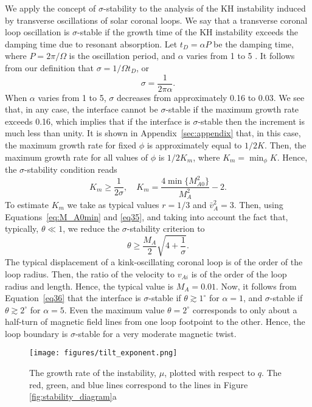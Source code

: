 \documentclass[12pt]{ociamthesis}
\begin{document}
We apply the concept of $\sigma$-stability to the analysis of the KH instability induced by transverse oscillations of solar coronal loops.
We say that a transverse coronal loop oscillation is $\sigma$-stable if the growth time of the KH instability exceeds the damping time due to resonant absorption.
Let $t_D = \alpha P$ be the damping time, where $P = 2 \pi / \Omega$ is the oscillation period, and $\alpha$ varies from 1 to 5 \citep[see, e.g.,][]{Goddard2016}.
It follows from our definition that $\sigma = 1/ \Omega t_D$, or
%
\begin{equation}
\label{eq34}
\sigma = \frac{1}{2\pi\alpha}.
\end{equation}
%
When $\alpha$ varies from 1 to 5, $\sigma$ decreases from approximately 0.16 to 0.03.
We see that, in any case, the interface cannot be $\sigma$\/-stable if the maximum growth rate exceeds 0.16, which implies that if the interface is $\sigma$\/-stable then the increment is much less than unity.
It is shown in Appendix~\ref{sec:appendix} that, in this case, the maximum growth rate for fixed $\phi$ is approximately equal to $1/2K$.
Then, the maximum growth rate for all values of $\phi$ is $1/2K_m$\/, where $K_m = \min_\phi K$.
Hence, the $\sigma$\/-stability condition reads
%
\begin{equation}
\label{eq35}
K_m \geq \frac1{2\sigma}, \quad K_m = \frac{4\min\{M_{A 0}^2\}}{M_A^2} - 2.
\end{equation}
%
To estimate $K_m$ we take as typical values $r = 1/3$ and $\bar v_A^2 = 3$.
Then, using Equations~\eqref{eq:M_A0min} and \eqref{eq35}, and taking into account the fact that, typically, $\theta \ll 1$, we reduce the $\sigma$-stability criterion to
%
\begin{equation}
\label{eq36}
\theta \geq \frac{M_A}{2} \sqrt{4 + \frac1\sigma}.
\end{equation}
%
The typical displacement of a kink-oscillating coronal loop is of the order of the loop radius.
Then, the ratio of the velocity to $v_{Ai}$ is of the order of the loop radius and length.
Hence, the typical value is $M_A = 0.01$.
Now, it follows from Equation~\eqref{eq36} that the interface is $\sigma$\/-stable if $\theta \gtrsim 1^\circ$ for $\alpha = 1$, and $\sigma$\/-stable if $\theta \gtrsim 2^\circ$ for $\alpha = 5$.
Even the maximum value $\theta = 2^\circ$ corresponds to only about a half-turn of magnetic field lines from one loop footpoint to the other.
Hence, the loop boundary is $\sigma$\/-stable for a very moderate magnetic twist.

\begin{figure}[t]
\centering
\texttt{[image: figures/tilt\_exponent.png]}
 \caption{The growth rate of the instability, $\mu$, plotted with respect to $q$. The red, green, and blue lines correspond to the lines in Figure \ref{fig:stability_diagram}a}
 \label{fig:mu}
\end{figure}
\end{document}
